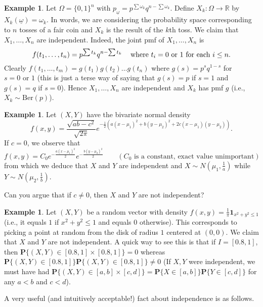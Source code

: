 \documentclass[preprint,  11pt]{amsart}
\theoremstyle{plain} %
\theoremstyle{definition} %
\newtheorem{example}[theorem]{Example}
\begin{document}
\begin{example} Let $\Omega=\{0,1\}^{n}$ with $p_{\underline{\omega}}=p^{\sum \omega_{k}}q^{n-\sum \omega_{k}}$. Define $X_{k}:\Omega\rightarrow \mathbb{R}$ by $X_{k}(\underline{\omega})=\omega_{k}$. In words, we are considering the probability space corresponding to $n$ tosses of a fair coin and $X_{k}$ is the result of the $k$th toss. We claim that $X_{1},\ldots ,X_{n}$ are independent. Indeed, the joint pmf of $X_{1},\ldots ,X_{n}$ is 
$$
f(t_{1},\ldots ,t_{n})=p^{\sum t_{k}}q^{n-\sum t_{k}} \hspace{3mm} \mbox{ where }t_{i}=0\mbox{ or }1 \mbox{ for each }i\le n.
$$
Clearly $f(t_{1},\ldots ,t_{m})=g(t_{1})g(t_{2})\ldots g(t_{n})$ where $g(s)=p^{s}q^{1-s}$ for $s=0\mbox{ or }1$ (this is just a terse way of saying that $g(s)=p$ if $s=1$ and $g(s)=q$ if $s=0$). Hence $X_{1},\ldots ,X_{n}$ are independent and $X_{k}$ has pmf $g$ (i.e., $X_{k}\sim \mbox{Ber}(p)$).
\end{example}

\begin{example} Let $(X,Y)$ have the bivariate normal density 
$$
f(x,y)=\frac{\sqrt{ab-c^{2}}}{\sqrt{2\pi}}e^{-\frac{1}{2}(a(x-\mu_{1})^{2}+b(y-\mu_{2})^{2}+2c(x-\mu_{1})(y-\mu_{2}))}.
$$
If $c=0$, we observe that 
$$
f(x,y) = C_{0} e^{-\frac{a(x-\mu_{1})^{2}}{2}}e^{-\frac{b(y-\mu_{2})^{2}}{2}} \qquad (C_{0}\mbox{ is a constant, exact value unimportant})
$$
from which we deduce that $X$ and $Y$ are independent and $X\sim N(\mu_{1},\frac{1}{a})$ while $Y\sim N(\mu_{2},\frac{1}{b})$.

Can you argue that if $c\not=0$, then $X$ and $Y$ are not independent?
\end{example}


\begin{example} Let $(X,Y)$ be a random vector with density $f(x,y)=\frac{1}{\pi}{\mathbf 1}_{x^{2}+y^{2}\le 1}$ (i.e., it equals $1$ if $x^{2}+y^{2}\le 1$ and equals  $0$ otherwise). This corresponds to picking a point at random from the disk of radius $1$ centered at $(0,0)$. We claim that $X$ and $Y$ are not independent. A quick way to see this is that if $I=[0.8,1]$, then $\mathbf{P}\{(X,Y)\in [0.8,1]\times [0.8,1]\}=0$ whereas $\mathbf{P}\{(X,Y)\in [0.8,1]\}\mathbf{P}\{(X,Y)\in [0.8,1]\}\not= 0$ (If $X,Y$ were independent, we must have had $\mathbf{P}\{(X,Y)\in [a,b]\times [c,d]\}=\mathbf{P}\{X\in [a,b]\}\mathbf{P}\{Y\in [c,d]\}$ for any $a<b$ and $c<d$).
\end{example}

A very useful (and intuitively acceptable!) fact about independence is as follows.
\end{document}
